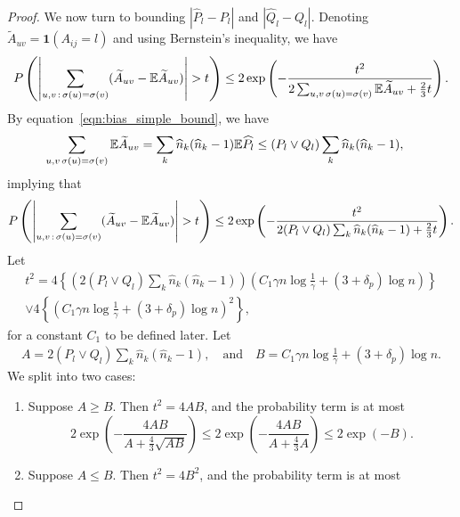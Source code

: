 \documentclass{article}
\begin{document}
\begin{proof}
We now turn to bounding $|\hat{P}_l - P_l|$ and $|\hat{Q}_l - Q_l|$. Denoting $ \tilde{A}_{uv} = \mathbf{1}(A_{ij} = l)$ and using Bernstein's inequality, we have
\[
P\left( \left| \sum_{u,v\,:\, \sigma(u) = \sigma(v)} (\widetilde{A}_{uv} - {\mathbb E} \widetilde{A}_{uv} ) \right|  > t 
 \right) \leq 2 \exp\left( 
    - \frac{t^2}{ 2 \sum_{u,v \, \sigma(u) = \sigma(v)} {\mathbb E} \widetilde{A}_{uv}  + \frac{2}{3}t }
\right).
\]
By equation~\eqref{eqn:bias_simple_bound}, we have
\begin{align*}
\sum_{u,v \, \sigma(u) = \sigma(v)} {\mathbb E} \widetilde{A}_{uv} &=
  \sum_k \widehat{n}_k (\widehat{n}_k - 1) {\mathbb E} \widehat{P}_l \leq (P_l \vee Q_l) \sum_k \widehat{n}_k (\widehat{n}_k - 1),
\end{align*}
implying that
\[
P\left( \left| \sum_{u,v\,:\, \sigma(u) = \sigma(v)} (\widetilde{A}_{uv} - {\mathbb E} \widetilde{A}_{uv} ) \right|  > t 
 \right) \leq 2 \exp\left( 
    - \frac{t^2}{ 2 (P_l \vee Q_l) \sum_k \widehat{n}_k (\widehat{n}_k - 1)  + \frac{2}{3}t } 
\right).
\]
Let
\begin{multline*}
t^2 = 4 \left\{  \left( 2 (P_l \vee Q_l) \sum_k \hat{n}_k (\hat{n}_k - 1) \right) 
      \left( 
     C_1\gamma n \log \frac{1}{\gamma} + (3+\delta_p) \log n \right) \right\} \\
      \vee 
   4  \left\{
   \left(  C_1\gamma n \log \frac{1}{\gamma} + (3 + \delta_p) \log n \right)^2 \right\},
\end{multline*}
for a constant $C_1$ to be defined later. Let
\begin{align*}
A = 2(P_l \vee Q_l)\sum_k \hat{n}_k (\hat{n}_k - 1), \quad \text{and} \quad B =  C_1\gamma n \log \frac{1}{\gamma} + (3+\delta_p) \log n.
\end{align*}
We split into two cases:
\begin{enumerate}
\item Suppose $A \geq B$. Then $t^2 = 4AB$, and the probability term is at most
\begin{equation*}
2 \exp \left( - \frac{4 AB}{A + \frac{4}{3} \sqrt{AB}} \right)  \leq 2 \exp \left( - \frac{4 AB}{A + \frac{4}{3} A} \right) \leq  2 \exp( - B ).
\end{equation*}
\item Suppose $A \leq B$. Then $t^2 = 4B^2$, and the probability term is at most

\end{enumerate}
\end{proof}
\end{document}

